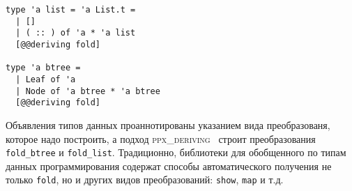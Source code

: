 \begin{lstlisting}
type 'a list = 'a List.t = 
  | [] 
  | ( :: ) of 'a * 'a list 
  [@@deriving fold]

type 'a btree = 
  | Leaf of 'a 
  | Node of 'a btree * 'a btree 
  [@@deriving fold]
\end{lstlisting}

\noindent Объявления типов данных проаннотированы указанием вида преобразованя, которое надо построить, а подход \textsc{ppx\_deriving}~\cite{ppxderiving} строит преобразования \lstinline{fold_btree} и \lstinline{fold_list}. Традиционно, библиотеки для обобщенного по типам данных программирования содержат способы автоматического получения не только \lstinline{fold}, но и других видов преобразований: \lstinline{show}, \lstinline{map} и т.д.




